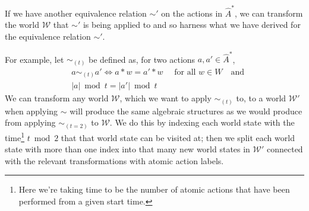 If we have another equivalence relation $\sim'$ on the actions in $\hat{A}^{*}$, we can transform the world $\mathscr{W}$ that $\sim'$ is being applied to and so harness what we have derived for the equivalence relation $\sim'$.

For example, let $\sim_{(t)}$ be defined as, for two actions $a, a' \in \hat{A}^{*}$,
\begin{align}
    & a \sim_{(t)} a' \iff a \ast w = a' \ast w \quad \text{ for all $w \in W$} \quad \text{and} \\
    & |a| \bmod t = |a'| \bmod t
\end{align}
We can transform any world $\mathscr{W}$, which we want to apply $\sim_{(t)}$ to, to a world $\mathscr{W}'$ when applying $\sim$ will produce the same algebraic structures as we would produce from applying $\sim_{(t=2)}$ to $\mathscr{W}$.
We do this by indexing each world state with the time\footnote{
Here we're taking time to be the number of atomic actions that have been performed from a given start time.
} $t \bmod 2$ that that world state can be visited at; then we split each world state with more than one index into that many new world states in $\mathscr{W}'$ connected with the relevant transformations with atomic action labels.
